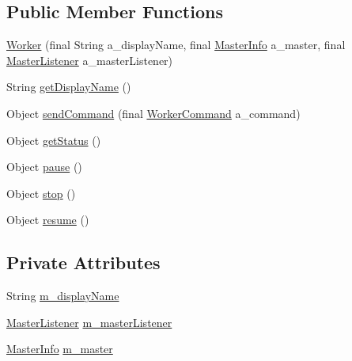 \subsection*{Public Member Functions}
\begin{DoxyCompactItemize}
\item 
\hyperlink{classorg_1_1jgap_1_1distr_1_1_worker_a0862f61abbb980c3c6252922e356e697}{Worker} (final String a\-\_\-display\-Name, final \hyperlink{classorg_1_1jgap_1_1distr_1_1_master_info}{Master\-Info} a\-\_\-master, final \hyperlink{classorg_1_1jgap_1_1distr_1_1_master_listener}{Master\-Listener} a\-\_\-master\-Listener)
\item 
String \hyperlink{classorg_1_1jgap_1_1distr_1_1_worker_a7e68f897ba168b0508674203daf586ae}{get\-Display\-Name} ()
\item 
Object \hyperlink{classorg_1_1jgap_1_1distr_1_1_worker_aee8f7803e2655bdfb3aceff9a3f92eb7}{send\-Command} (final \hyperlink{classorg_1_1jgap_1_1distr_1_1_worker_command}{Worker\-Command} a\-\_\-command)
\item 
Object \hyperlink{classorg_1_1jgap_1_1distr_1_1_worker_a405f281453fcdd0046a370a001af92ef}{get\-Status} ()
\item 
Object \hyperlink{classorg_1_1jgap_1_1distr_1_1_worker_aea81d8531d56e4035cd94c5278e5c604}{pause} ()
\item 
Object \hyperlink{classorg_1_1jgap_1_1distr_1_1_worker_a7ecb6526e7b056129e7f4f8a584865de}{stop} ()
\item 
Object \hyperlink{classorg_1_1jgap_1_1distr_1_1_worker_afc27690dd01d55455271aba6dc32b434}{resume} ()
\end{DoxyCompactItemize}
\subsection*{Private Attributes}
\begin{DoxyCompactItemize}
\item 
String \hyperlink{classorg_1_1jgap_1_1distr_1_1_worker_a4f95b57112e0f70df3c4dea695104cee}{m\-\_\-display\-Name}
\item 
\hyperlink{classorg_1_1jgap_1_1distr_1_1_master_listener}{Master\-Listener} \hyperlink{classorg_1_1jgap_1_1distr_1_1_worker_aea3bcf9d90ca3b75efd3b342df8861e7}{m\-\_\-master\-Listener}
\item 
\hyperlink{classorg_1_1jgap_1_1distr_1_1_master_info}{Master\-Info} \hyperlink{classorg_1_1jgap_1_1distr_1_1_worker_a70aaa7dde62236412db41eaf80187c57}{m\-\_\-master}
\end{DoxyCompactItemize}
